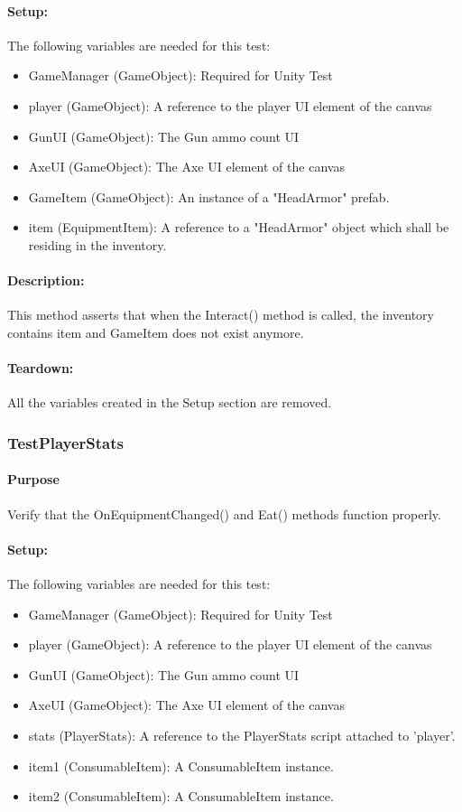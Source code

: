 \documentclass[12pt, titlepage]{article}
\begin{document}
\paragraph{Setup: } The following variables are needed for this test:
\begin{itemize}
	\item GameManager (GameObject): Required for Unity Test
	\item  player (GameObject): A reference to the player UI element of the canvas
	\item  GunUI (GameObject): The Gun ammo count UI
	\item AxeUI (GameObject): The Axe UI element of the canvas
	\item GameItem (GameObject): An instance of a "HeadArmor" prefab.
	\item item (EquipmentItem): A reference to a "HeadArmor" object which shall be residing in the inventory.
	
\end{itemize}
\paragraph{Description: }
This method asserts that when the Interact() method is called, the inventory contains item and GameItem does not exist anymore.

\paragraph{Teardown: } All the variables created in the Setup section are removed.

\subsubsection{Test\textunderscore PlayerStats}

\paragraph{Purpose} Verify that the OnEquipmentChanged() and Eat() methods function properly.

\paragraph{Setup: } The following variables are needed for this test:
\begin{itemize}
	\item GameManager (GameObject): Required for Unity Test
	\item  player (GameObject): A reference to the player UI element of the canvas
	\item  GunUI (GameObject): The Gun ammo count UI
	\item AxeUI (GameObject): The Axe UI element of the canvas
	\item stats (PlayerStats): A reference to the PlayerStats script attached to 'player'.
	\item item1 (ConsumableItem): A ConsumableItem instance.
	\item item2 (ConsumableItem): A ConsumableItem instance.
	
\end{itemize}
\end{document}
